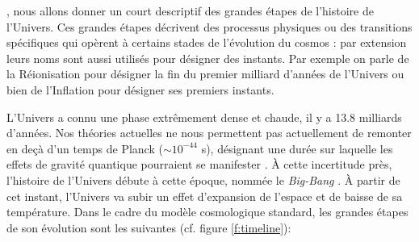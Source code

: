 , nous allons donner un court descriptif des grandes étapes de l'histoire de l'Univers. Ces grandes étapes décrivent des processus physiques ou des transitions spécifiques qui opèrent à certains stades de l'évolution du cosmos : par extension leurs noms sont aussi utilisés pour désigner des instants. Par exemple on parle de la Réionisation pour désigner la fin du premier milliard d'années de l'Univers ou bien de l'Inflation pour désigner ses premiers instants.

L'Univers a connu une phase extrêmement dense et chaude, il y a 13.8 milliards d'années. Nos théories actuelles ne nous permettent pas actuellement de remonter en deçà d'un temps de Planck ($\sim 10^{-44}$ s),  désignant une durée sur laquelle les effets de gravité quantique pourraient se manifester . À cette incertitude près, l'histoire de l'Univers débute à cette époque, nommée le \textit{Big-Bang} . À partir de cet instant, l'Univers va subir un effet d'expansion de l'espace et de baisse de sa température. Dans le cadre du modèle cosmologique standard, les grandes étapes de son évolution sont les suivantes (cf. figure \ref{f:timeline}):
